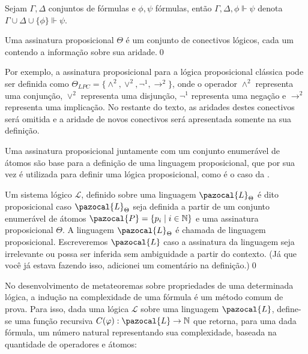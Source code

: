     \begin{notacao}
        Sejam $\Gamma, \Delta$ conjuntos de fórmulas e $\phi, \psi$ fórmulas, então $\Gamma, \Delta, \phi \Vdash \psi$ denota $\Gamma \cup \Delta \cup \{\phi\} \Vdash \psi$.
    \end{notacao}

    \begin{definicao}\label{def:ass_prop}
        Uma assinatura proposicional $\Theta$ é um conjunto de conectivos lógicos, cada um contendo a informação sobre sua aridade.\qed{}
    \end{definicao}
    Por exemplo, a assinatura proposicional para a lógica proposicional clássica pode ser definida como $\Theta_{LPC} = \{\land^{2}, \lor^{2}, \neg^{1}, \to^{2}\}$, onde o operador $\land^{2}$ representa uma conjunção, $\lor^{2}$ representa uma disjunção, $\neg^{1}$ representa uma negação e $\to^{2}$ representa uma implicação. No restante do texto, as aridades destes conectivos será omitida e a aridade de novos conectivos será apresentada somente na sua definição.

    Uma assinatura proposicional juntamente com um conjunto enumerável de átomos são base para a definição de uma linguagem proposicional, que por sua vez é utilizada para definir uma lógica proposicional, como é o caso da \lfium{}.

    \begin{definicao}\label{def:proposicional}
        Um sistema lógico $\mathcal{L}$, definido sobre uma linguagem $\pazocal{L}_{\Theta}$ é dito proposicional caso $\pazocal{L}_{\Theta}$ seja definida a partir de um conjunto enumerável de átomos $\pazocal{P} = \{p_{i} \;| \; i \in \mathbb{N} \}$ e uma assinatura proposicional $\Theta$. A linguagem $\pazocal{L}_{\Theta}$ é chamada de linguagem proposicional. Escreveremos $\pazocal{L}$ caso a assinatura da linguagem seja irrelevante ou possa ser inferida sem ambiguidade a partir do contexto. (Já que você já estava fazendo isso, adicionei um comentário na definição.)\qed{}
    \end{definicao}


    No desenvolvimento de metateoremas sobre propriedades de uma determinada lógica, a indução na complexidade de uma fórmula é um método comum de prova. Para isso, dada uma lógica $\mathcal{L}$ sobre uma linguagem $\pazocal{L}$, define-se uma função recursiva $C(\phi) : \pazocal{L} \to \mathbb{N}$ que retorna, para uma dada fórmula, um número natural representando sua complexidade, baseada na quantidade de operadores e átomos:

